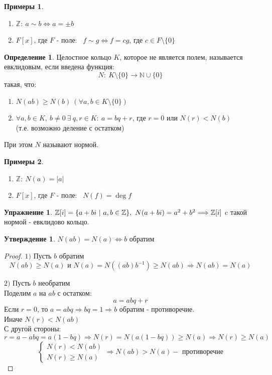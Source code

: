 \documentclass[a4paper, 12pt]{article}
\newcommand{\Z}{\mathbb Z}
\newcommand{\N}{\mathbb N}
\newcommand\tab[1][.5cm]{\hspace*{#1}}
\theoremstyle{definition}
\newtheorem*{definition}{Определение}
\newtheorem*{subtheorem}{Утверждение}
\newtheorem*{example}{Примеры}
\newtheorem*{Exercise}{Упражнение}
\begin{document}
  \begin{example}\tab
    \begin{enumerate}
      \item $\Z: \ a \sim b \Longleftrightarrow a= \pm  b$
      \item $F[x]$, где $F$ - поле: \ 
      $f\sim g \Longleftrightarrow f = cg$, где $c \in F \setminus \{0\}$
    \end{enumerate}
  \end{example}
  \begin{definition}
    Целостное кольцо $K$, которое не является полем, называется евклидовым, если введена функция:
    $$N: \ K\setminus \{0\} \to \N \cup \{0\}$$
    такая, что:
    \begin{enumerate}
      \item $N(ab)\geq N(b) \ (\forall a, b \in K\setminus \{0\})$
      \item $\forall a, b \in K, \ b\neq 0 \ \exists \ q, r \in K :  \ a = bq+r$, где $r=0$ или $N(r)<N(b)$ \\
      (т.е. возможно деление с остатком)   
    \end{enumerate}
    При этом $N$ называют нормой.  
  \end{definition}
  \begin{example}\tab
    \begin{enumerate}
      \item $\Z: \  N(a) = |a|$
      \item $F[x]$, где $F$ - поле: \ $N(f) = \deg f$   
    \end{enumerate}
  \end{example}
  \begin{Exercise}
    $\Z[i] = \{a+bi \ | \ a, b \in \Z\}, \ N(a + bi) = a^2 + b^2 \Longrightarrow \\
    \Z[i]$ c такой нормой - евклидово кольцо. 
  \end{Exercise}
  \begin{subtheorem}
    $N(ab) = N(a) \Longleftrightarrow b$ обратим 
  \end{subtheorem}
  \begin{proof}\tab
    \item[$1)$] Пусть $b$ обратим
    $$N(ab) \geq N(a) \text{ и } N(a) = N((ab)b^{-1}) \geq N(ab) \Longrightarrow N(ab) = N(a)$$
    \item[$2)$] Пусть $b$ необратим\\
    Поделим $a$ на $ab$ с остатком: 
    $$a = abq + r$$
    Если $r =0$, то $a = abq \Longrightarrow bq = 1 \Longrightarrow b$ обратим - противоречие.\\
    Иначе $N(r)<N(ab)$\\
    С другой стороны: $$r = a - abq = a(1-bq) \Longrightarrow N(r) = N(a(1-bq)) \geq N(a) \Longrightarrow N(r) \geq N(a)$$
    $$\begin{cases}
      N(r)<N(ab) \\
      N(r) \geq N(a)
    \end{cases} \Longrightarrow N(ab) > N(a) - \text{ противоречие}$$
  \end{proof}
\end{document}
